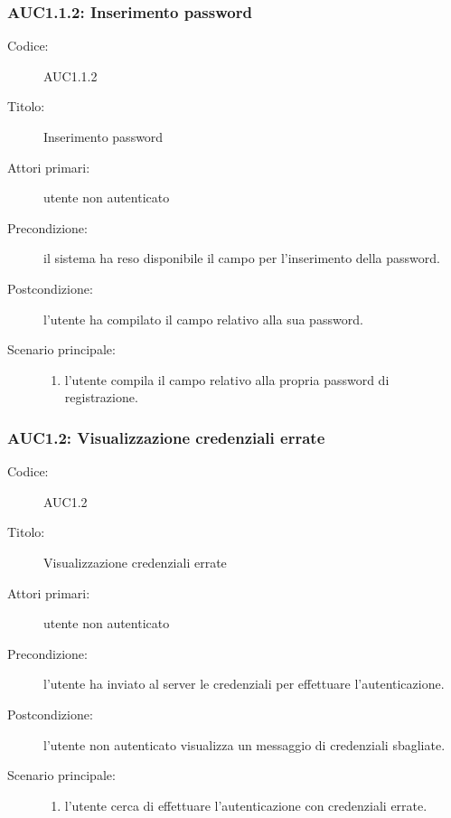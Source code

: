 \documentclass[../../../analisi-dei-requisiti.tex]{subfiles}
\begin{document}
\subsubsection{AUC1.1.2: Inserimento password}%
\label{subs:AUC1.1.2}
\begin{description}
  \item[Codice:] AUC1.1.2
  \item[Titolo:] Inserimento password
  \item[Attori primari:] utente non autenticato
  \item[Precondizione:] il sistema ha reso disponibile il campo per l'inserimento della password.
  \item[Postcondizione:] l'utente ha compilato il campo relativo alla sua password.
  \item[Scenario principale:]
  \begin{enumerate}
    \item l'utente compila il campo relativo alla propria password di registrazione.
  \end{enumerate}
\end{description}

\subsubsection{AUC1.2: Visualizzazione credenziali errate}%
\label{subs:AUC1.2}
\begin{description}
  \item[Codice:] AUC1.2
  \item[Titolo:] Visualizzazione credenziali errate
  \item[Attori primari:] utente non autenticato
  \item[Precondizione:] l'utente ha inviato al server le credenziali per effettuare l'autenticazione.
  \item[Postcondizione:] l'utente non autenticato visualizza un messaggio di credenziali sbagliate.
  \item[Scenario principale:]
  \begin{enumerate}
    \item l'utente cerca di effettuare l'autenticazione con credenziali errate.
  \end{enumerate}
\end{description}
\end{document}

